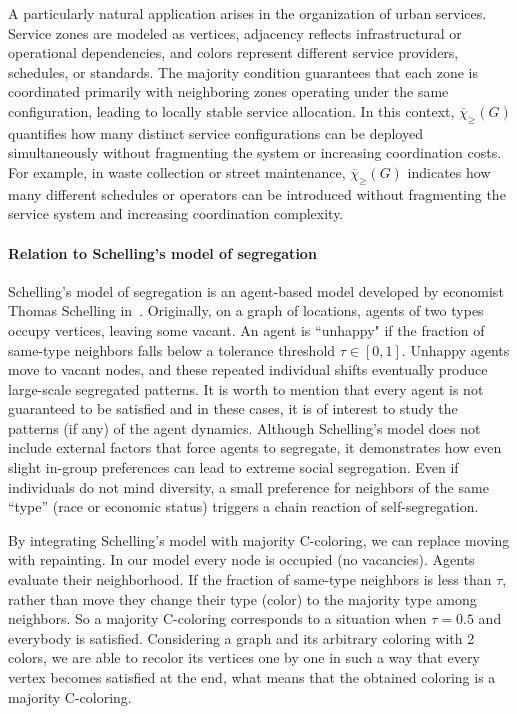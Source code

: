 \documentclass{article}
\theoremstyle{definition}
\newcommand{\mc}{\overline{\chi}_{\geqslant}}
\begin{document}
A particularly natural application arises in the organization of urban services. Service zones are modeled as vertices, adjacency reflects infrastructural or operational dependencies, and colors represent different service providers, schedules, or standards. The majority condition guarantees that each zone is coordinated primarily with neighboring zones operating under the same configuration, leading to locally stable service allocation. In this context, $\mc(G)$ quantifies how many distinct service configurations can be deployed simultaneously without fragmenting the system or increasing coordination costs. For example, in waste collection or street maintenance, $\mc(G)$ indicates how many different schedules or operators can be introduced without fragmenting the service system and increasing coordination complexity.



\paragraph{Relation to Schelling's model of segregation}
Schelling's model of segregation is an agent-based model developed by economist Thomas Schelling in~\cite{schelling}. Originally, on a graph of locations, agents of two types occupy vertices, leaving some vacant. An agent is ``unhappy" if the fraction of same-type neighbors falls below a tolerance threshold $\tau\in [0,1]$. Unhappy agents move to vacant nodes, and these repeated individual shifts eventually produce large-scale segregated patterns. It is worth to mention that every agent is not guaranteed to be satisfied and in these cases, it is of interest to study the patterns (if any) of the agent dynamics. 
Although Schelling's model does not include external factors that force agents to segregate, it demonstrates how even slight in-group preferences can lead to extreme social segregation.
Even if individuals do not mind diversity, a small preference for neighbors of the same ``type'' (race or economic status) triggers a chain reaction of self-segregation.  

By integrating Schelling's model with majority C-coloring, we can replace moving with repainting. In our model every node is occupied (no vacancies). Agents evaluate their neighborhood. If the fraction of same-type neighbors is less than $\tau$, rather than move they change their type (color) to the majority type among neighbors. 
So a majority C-coloring  corresponds to a situation when $\tau=0.5$ and everybody is satisfied. Considering a graph and its arbitrary coloring with 2 colors, we are able to recolor its vertices one by one in such a way that every vertex becomes satisfied at the end, what means that the obtained coloring is a majority C-coloring.
    
\end{document}
